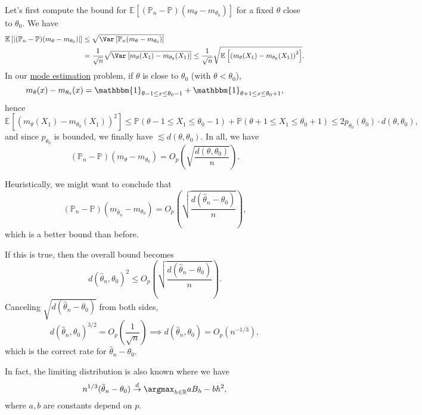 Let's first compute the bound for \(\mathbb{E}_{}\left[(\mathbb{P} _n - \mathbb{P} ) (m_\theta - m_{\theta _0})\right] \) for a fixed \(\theta \) close to \(\theta _0\). We have
\[
	\begin{split}
		\mathbb{E}_{}\left[\vert (\mathbb{P} _n - \mathbb{P} ) (m_\theta - m_{\theta _0}) \vert \right]
		&\leq \sqrt{\Var_{}\left[\mathbb{P} _n(m_\theta - m_{\theta _0}) \right] } \\
		&= \frac{1}{\sqrt{n} } \sqrt{\Var_{}\left[m_\theta (X_1) - m_{\theta _0}(X_1) \right] }
		\leq \frac{1}{\sqrt{n} } \sqrt{\mathbb{E}_{}\left[\left( m_\theta (X_1) - m_{\theta _0}(X_1) \right) ^2 \right] } .
	\end{split}
\]
In our \hyperref[eg:mode-estimation]{mode estimation} problem, if \(\theta \) is close to \(\theta _0\) (with \(\theta < \theta _0\)),
\[
	m_\theta (x) - m_{\theta _0}(x)
	= \mathbbm{1}_{\theta -1 \leq x \leq \theta _0 - 1} + \mathbbm{1}_{\theta +1 \leq x \leq \theta _0 + 1},
\]
hence
\[
	\mathbb{E}_{}\left[\left( m_\theta (X_1) - m_{\theta _0}(X_1) \right) ^2 \right]
	\leq \mathbb{P} (\theta -1 \leq X_1 \leq \theta _0 - 1) + \mathbb{P} (\theta +1 \leq X_1 \leq \theta _0 + 1)
	\leq 2 p_{\theta _0}(\theta _0) \cdot d(\theta , \theta _0) ,
\]
and since \(p_{\theta _0}\) is bounded, we finally have \(\lesssim d(\theta , \theta _0)\). In all, we have
\[
	(\mathbb{P} _n - \mathbb{P} )(m_\theta - m_{\theta _0})
	= O_p \left( \sqrt{\frac{d(\theta , \theta _0)}{n}} \right) .
\]

\begin{intuition}[Heuristic]
	Heuristically, we might want to conclude that
	\[
		(\mathbb{P} _n - \mathbb{P} ) (m_{\hat{\theta } _n } - m_{\theta _0})
		= O_p \left( \sqrt{\frac{d(\hat{\theta } _n - \theta _0)}{n}} \right),
	\]
	which is a better bound than before.
\end{intuition}

If this is true, then the overall bound becomes
\[
	d(\hat{\theta } _n , \theta _0)^2
	\leq O_p \left( \sqrt{\frac{d(\hat{\theta } _n - \theta _0)}{n}} \right) .
\]
Canceling \(\sqrt{d(\hat{\theta } _n - \theta _0)} \) from both sides,
\[
	d(\hat{\theta } _n , \theta _0)^{3 / 2} = O_p \left( \frac{1}{\sqrt{n} } \right)
	\implies d(\hat{\theta } _n , \theta _0) = O_p(n^{-1 / 3}),
\]
which is the correct rate for \(\hat{\theta } _n - \theta _0\).

\begin{remark}
	In fact, the limiting distribution is also known where we have
	\[
		n^{1 / 3} (\hat{\theta } _n - \theta _0) \overset{d}{\to } \argmax_{h\in \mathbb{R} } aB_h - b h^2,
	\]
	where \(a, b\) are constants depend on \(p\).
\end{remark}